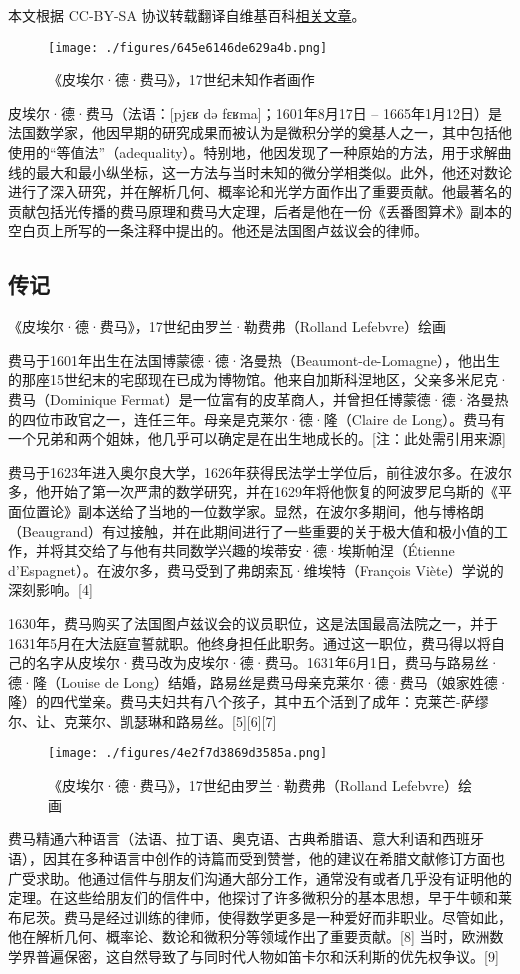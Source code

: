
本文根据 CC-BY-SA 协议转载翻译自维基百科\href{https://en.wikipedia.org/wiki/Pierre_de_Fermat}{相关文章}。

\begin{figure}[ht]
\centering
\texttt{[image: ./figures/645e6146de629a4b.png]}
\caption{《皮埃尔·德·费马》，17世纪未知作者画作} \label{fig_Pierre_1}
\end{figure}
皮埃尔·德·费马（法语：[pjɛʁ də fɛʁma]；1601年8月17日 – 1665年1月12日）是法国数学家，他因早期的研究成果而被认为是微积分学的奠基人之一，其中包括他使用的“等值法”（adequality）。特别地，他因发现了一种原始的方法，用于求解曲线的最大和最小纵坐标，这一方法与当时未知的微分学相类似。此外，他还对数论进行了深入研究，并在解析几何、概率论和光学方面作出了重要贡献。他最著名的贡献包括光传播的费马原理和费马大定理，后者是他在一份《丢番图算术》副本的空白页上所写的一条注释中提出的。他还是法国图卢兹议会的律师。
\subsection{传记}
《皮埃尔·德·费马》，17世纪由罗兰·勒费弗（Rolland Lefebvre）绘画

费马于1601年出生在法国博蒙德·德·洛曼热（Beaumont-de-Lomagne），他出生的那座15世纪末的宅邸现在已成为博物馆。他来自加斯科涅地区，父亲多米尼克·费马（Dominique Fermat）是一位富有的皮革商人，并曾担任博蒙德·德·洛曼热的四位市政官之一，连任三年。母亲是克莱尔·德·隆（Claire de Long）。费马有一个兄弟和两个姐妹，他几乎可以确定是在出生地成长的。[注：此处需引用来源]

费马于1623年进入奥尔良大学，1626年获得民法学士学位后，前往波尔多。在波尔多，他开始了第一次严肃的数学研究，并在1629年将他恢复的阿波罗尼乌斯的《平面位置论》副本送给了当地的一位数学家。显然，在波尔多期间，他与博格朗（Beaugrand）有过接触，并在此期间进行了一些重要的关于极大值和极小值的工作，并将其交给了与他有共同数学兴趣的埃蒂安·德·埃斯帕涅（Étienne d'Espagnet）。在波尔多，费马受到了弗朗索瓦·维埃特（François Viète）学说的深刻影响。[4]

1630年，费马购买了法国图卢兹议会的议员职位，这是法国最高法院之一，并于1631年5月在大法庭宣誓就职。他终身担任此职务。通过这一职位，费马得以将自己的名字从皮埃尔·费马改为皮埃尔·德·费马。1631年6月1日，费马与路易丝·德·隆（Louise de Long）结婚，路易丝是费马母亲克莱尔·德·费马（娘家姓德·隆）的四代堂亲。费马夫妇共有八个孩子，其中五个活到了成年：克莱芒-萨缪尔、让、克莱尔、凯瑟琳和路易丝。[5][6][7]
\begin{figure}[ht]
\centering
\texttt{[image: ./figures/4e2f7d3869d3585a.png]}
\caption{《皮埃尔·德·费马》，17世纪由罗兰·勒费弗（Rolland Lefebvre）绘画} \label{fig_Pierre_2}
\end{figure}
费马精通六种语言（法语、拉丁语、奥克语、古典希腊语、意大利语和西班牙语），因其在多种语言中创作的诗篇而受到赞誉，他的建议在希腊文献修订方面也广受求助。他通过信件与朋友们沟通大部分工作，通常没有或者几乎没有证明他的定理。在这些给朋友们的信件中，他探讨了许多微积分的基本思想，早于牛顿和莱布尼茨。费马是经过训练的律师，使得数学更多是一种爱好而非职业。尽管如此，他在解析几何、概率论、数论和微积分等领域作出了重要贡献。[8] 当时，欧洲数学界普遍保密，这自然导致了与同时代人物如笛卡尔和沃利斯的优先权争议。[9]


